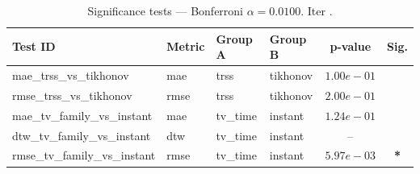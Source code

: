 ﻿%
\begin{table}[ht]
\centering
\caption[EEG reconstruction - Iteration it39]{Significance tests — Bonferroni $\alpha=0.0100$. Iter .}
\label{tab:sig_it39_physionet_gaussian_nnk_knn}
\small
\begin{tabular}{llllcc}
\toprule
Test ID & Metric & Group A & Group B & p-value & Sig. \\
\midrule
mae\_trss\_vs\_tikhonov & mae & trss & tikhonov & $1.00e-01$ &  \\
rmse\_trss\_vs\_tikhonov & rmse & trss & tikhonov & $2.00e-01$ &  \\
mae\_tv\_family\_vs\_instant & mae & tv\_time & instant & $1.24e-01$ &  \\
dtw\_tv\_family\_vs\_instant & dtw & tv\_time & instant & -- &  \\
rmse\_tv\_family\_vs\_instant & rmse & tv\_time & instant & $5.97e-03$ & \textbf{*} \\
\bottomrule
\end{tabular}
\end{table}







